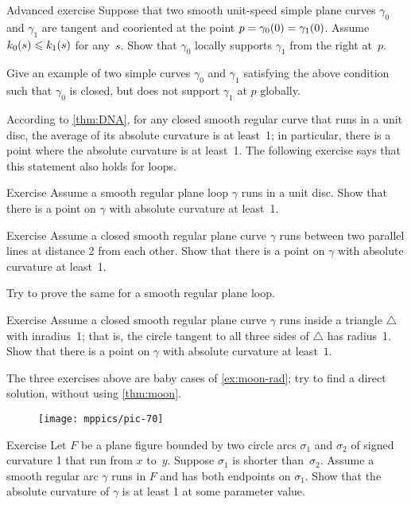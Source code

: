 \begin{thm}{Advanced exercise}\label{ex:support}
Suppose that two smooth unit-speed simple plane curves $\gamma_0$ and $\gamma_1$ are tangent and cooriented at the point $p\z=\gamma_0(0)\z=\gamma_1(0)$.
Assume $k_0(s)\leqslant k_1(s)$ for any~$s$.
Show that $\gamma_0$ locally supports $\gamma_1$ from the right at~$p$.

Give an example of two simple curves $\gamma_0$ and $\gamma_1$ satisfying the above condition such that $\gamma_0$ is closed, but does not support $\gamma_1$ at $p$ globally.
\end{thm}

According to \ref{thm:DNA}, for any closed smooth regular curve that runs in a unit disc, the average of its absolute curvature is at least~1; in particular, there is a point where the absolute curvature is at least~1.
The following exercise says that this statement also holds for loops.

\begin{thm}{Exercise}\label{ex:in-circle}
Assume a smooth regular plane loop $\gamma$ runs in a unit disc.
Show that there is a point on $\gamma$ with absolute curvature at least~1.
\end{thm}


\begin{thm}{Exercise}\label{ex:between-parallels-1}
Assume a closed smooth regular plane curve $\gamma$ runs between two parallel lines at distance 2 from each other.
Show that there is a point on $\gamma$ with absolute curvature at least~1.

Try to prove the same for a smooth regular plane loop.
\end{thm}

\begin{thm}{Exercise}\label{ex:in-triangle}
Assume a closed smooth regular plane curve $\gamma$ runs inside a triangle $\triangle$ with inradius~1; that is, the circle tangent to all three sides of $\triangle$ has radius~1. 
Show that there is a point on $\gamma$ with absolute curvature at least~$1$.
\end{thm}

The three exercises above are baby cases of \ref{ex:moon-rad}; try to find a direct solution, without using \ref{thm:moon}.

{

\begin{wrapfigure}{o}{32 mm}
\vskip-4mm
\centering
\texttt{[image: mppics/pic-70]}
\vskip0mm
\end{wrapfigure}

\begin{thm}{Exercise}\label{ex:lens}
Let $F$ be a plane figure bounded by two circle arcs $\sigma_1$ and $\sigma_2$ of signed curvature 1 that run from $x$ to~$y$.
Suppose $\sigma_1$ is shorter than~$\sigma_2$.
Assume a smooth regular arc $\gamma$ runs in $F$ and has both endpoints on $\sigma_1$.
Show that the absolute curvature of $\gamma$ is at least 1 at some parameter value.

\end{thm}

}


